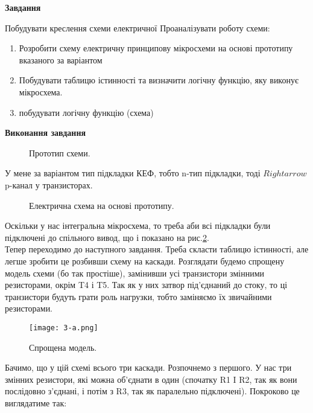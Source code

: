 \documentclass[a4paper,14pt]{extreport}
\begin{document}
\begin{center}
    \textbf{Завдання}
\end{center}
Побудувати креслення схеми електричної
Проаналізувати роботу схеми:

\begin{enumerate}
  \item Розробити схему електричну принципову мікросхеми на основі прототипу вказаного за варіантом
  \item Побудувати таблицю істинності та визначити логічну функцію, яку виконує мікросхема.
  \item побудувати логічну функцію (схема)
\end{enumerate}

\begin{center}
  \textbf{Виконання завдання}
\end{center}

\begin{figure}[h!]
\caption{Прототип схеми.}
\label{ris1}
\end{figure}
У мене за варіантом тип підкладки КЕФ, тобто n-тип підкладки, тоді $Rightarrow$ p-канал у транзисторах.

\begin{figure}[h!]
\caption{Електрична схема на основі прототипу.}
\label{ris2}
\end{figure}
Оскільки у нас інтегральна мікросхема, то треба аби всі підкладки були підключені до спільного вивод, що і показано на рис.\ref{ris2}.\\

Тепер переходимо до наступного завдання. Треба скласти таблицю істинності, але легше зробити це розбивши схему на каскади. Розглядати будемо спрощену модель схеми (бо так простіше), замінивши усі транзистори змінними резисторами, окрім T4 і T5. Так як у них затвор під’єднаний до стоку, то ці транзистори будуть грати роль нагрузки, тобто заміняємо їх звичайними резисторами.
\newpage


\begin{figure}[h!]
\begin{center}\texttt{[image: 3-a.png]}\end{center}
\caption{Спрощена модель.}
\label{ris3}
\end{figure}


Бачимо, що у цій схемі всього три каскади. Розпочнемо з першого. У нас три змінних резистори, які можна об’єднати в один (спочатку R1 I R2, так як вони послідовно з'єднані, і потім з R3, так як паралельно підключені). Покроково це виглядатиме так:
\end{document}
